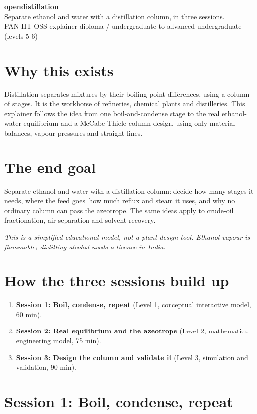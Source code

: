 \documentclass[11pt,a4paper]{article}
\begin{document}
\begin{center}{\LARGE\bfseries opendistillation}\\[0.4em]{\large Separate ethanol and water with a distillation column, in three sessions.}\\[0.2em]\small PAN IIT OSS explainer \textbullet{} diploma / undergraduate to advanced undergraduate (levels 5-6)\end{center}

\section*{Why this exists}
Distillation separates mixtures by their boiling-point differences, using a column of stages. It is the workhorse of refineries, chemical plants and distilleries. This explainer follows the idea from one boil-and-condense stage to the real ethanol-water equilibrium and a McCabe-Thiele column design, using only material balances, vapour pressures and straight lines.

\section*{The end goal}
Separate ethanol and water with a distillation column: decide how many stages it needs, where the feed goes, how much reflux and steam it uses, and why no ordinary column can pass the azeotrope. The same ideas apply to crude-oil fractionation, air separation and solvent recovery.

\textit{This is a simplified educational model, not a plant design tool. Ethanol vapour is flammable; distilling alcohol needs a licence in India.}

\section*{How the three sessions build up}
\begin{enumerate}[nosep]
\item \textbf{Session 1: Boil, condense, repeat} (Level 1, conceptual interactive model, 60 min).
\item \textbf{Session 2: Real equilibrium and the azeotrope} (Level 2, mathematical engineering model, 75 min).
\item \textbf{Session 3: Design the column and validate it} (Level 3, simulation and validation, 90 min).
\end{enumerate}

\section{Session 1: Boil, condense, repeat}
\end{document}
